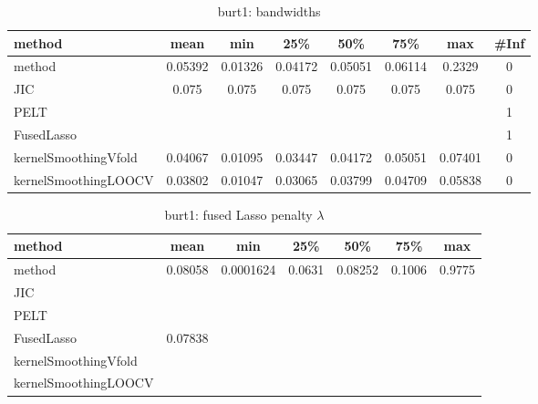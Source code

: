 \begin{table}[ht]
\centering
\begin{tabular}{l|c|ccccc|c}
  \hline
method & mean & min & 25\% & 50\% & 75\% & max & \#Inf \\ 
  \hline
method & 0.05392 & 0.01326 & 0.04172 & 0.05051 & 0.06114 & 0.2329 &   0 \\ 
  JIC & 0.075 & 0.075 & 0.075 & 0.075 & 0.075 & 0.075 &   0 \\ 
  PELT &  &  &  &  &  &  &   1 \\ 
  FusedLasso &  &  &  &  &  &  &   1 \\ 
  kernelSmoothingVfold & 0.04067 & 0.01095 & 0.03447 & 0.04172 & 0.05051 & 0.07401 &   0 \\ 
  kernelSmoothingLOOCV & 0.03802 & 0.01047 & 0.03065 & 0.03799 & 0.04709 & 0.05838 &   0 \\ 
   \hline
\end{tabular}
\caption{burt1: bandwidths} 
\label{tab:burt1Bandwidths}
\end{table}
\begin{table}[ht]
\centering
\begin{tabular}{l|c|ccccc}
  \hline
method & mean & min & 25\% & 50\% & 75\% & max \\ 
  \hline
method & 0.08058 & 0.0001624 & 0.0631 & 0.08252 & 0.1006 & 0.9775 \\ 
  JIC &  &  &  &  &  &  \\ 
  PELT &  &  &  &  &  &  \\ 
  FusedLasso & 0.07838 &  &  &  &  &  \\ 
  kernelSmoothingVfold &  &  &  &  &  &  \\ 
  kernelSmoothingLOOCV &  &  &  &  &  &  \\ 
   \hline
\end{tabular}
\caption{burt1: fused Lasso penalty $\lambda$} 
\label{tab:burt1Lambdas}
\end{table}
